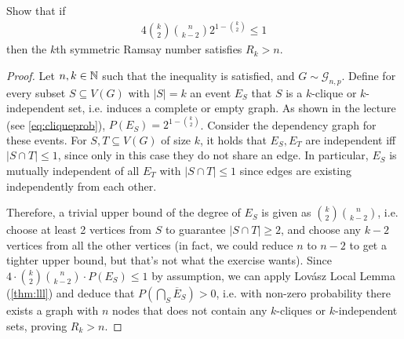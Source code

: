 \begin{aufgabe}
	Show that if
	\begin{align*}
		4 \binom{k}{2}\binom{n}{k-2}2^{1-\binom{k}{2}} \leq 1
	\end{align*}
	then the $k$th symmetric Ramsay number satisfies $R_k > n$.
	
	\begin{proof}	
	Let $n,k \in \mathbb{N}$ such that the inequality is satisfied, and $G \sim \mathcal{G}_{n,p}$.
	Define for every subset $S \subseteq V(G)$ with $|S|=k$ an event $E_S$ that $S$ is a $k$-clique or $k$-independent set, i.e. induces a complete or empty graph.
	As shown in the lecture (see \eqref{eq:cliqueprob}), $P(E_S) = 2^{1-\binom{k}{2}}$.  
	Consider the dependency graph for these events.
	For $S,T \subseteq V(G)$ of size $k$, it holds that $E_S,E_T$ are independent iff $|S\cap T| \leq 1$,
	since only in this case they do not share an edge.
	In particular, $E_S$ is mutually independent of all $E_T$ with $|S \cap T| \leq 1$ since edges are existing independently from each other.
	
	Therefore, a trivial upper bound of the degree of $E_S$ is given as $\binom{k}{2}\binom{n}{k-2}$,
	i.e. choose at least 2 vertices from $S$ to guarantee $|S \cap T| \geq 2$, and choose any $k-2$ vertices from all the other vertices 
	(in fact, we could reduce $n$ to $n-2$ to get a tighter upper bound, but that's not what the exercise wants).
	Since $4 \cdot \binom{k}{2}\binom{n}{k-2} \cdot P(E_S) \leq 1$ by assumption, 
	we can apply Lovász Local Lemma (\autoref{thm:lll}) and deduce that $P(\bigcap_S \overline{E}_S) > 0$,
	i.e. with non-zero probability there exists a graph with $n$ nodes that does not contain any $k$-cliques or $k$-independent sets,
	proving $R_k > n$. 
\end{proof}
\end{aufgabe}
